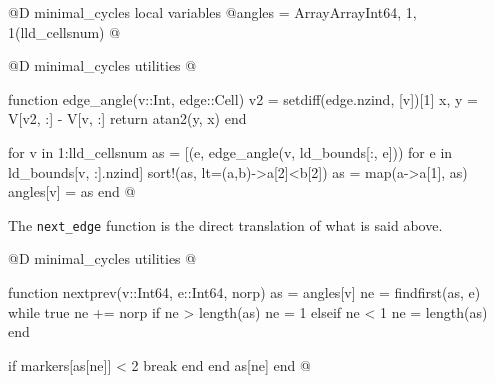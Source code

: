 \documentclass[10pt]{book}
\begin{document}
@D minimal\_cycles local variables
@{angles = Array{Array{Int64, 1}, 1}(lld_cellsnum)
@}

@D minimal\_cycles utilities
@{function edge_angle(v::Int, edge::Cell)
    v2 = setdiff(edge.nzind, [v])[1]
    x, y = V[v2, :] - V[v, :]
    return atan2(y, x)
end

for v in 1:lld_cellsnum
    as = [(e, edge_angle(v, ld_bounds[:, e])) for e in ld_bounds[v, :].nzind]
    sort!(as, lt=(a,b)->a[2]<b[2])
    as = map(a->a[1], as)
    angles[v] = as
end
@}

The \texttt{next\_edge} function is the direct translation of what is said above.

@D minimal\_cycles utilities
@{function nextprev(v::Int64, e::Int64, norp)
    as = angles[v]
    ne = findfirst(as, e)
    while true
        ne += norp
        if ne > length(as)
            ne = 1
        elseif ne < 1
            ne = length(as)
        end

        if markers[as[ne]] < 2
            break
        end
    end
    as[ne]
end
@}

\backmatter


{}

\end{document}
